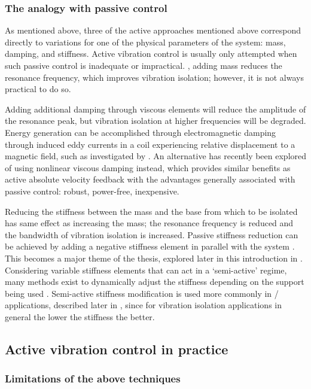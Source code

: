 \subsubsection{The analogy with passive control}

As mentioned above, three of the active approaches mentioned above correspond directly to variations for one of the physical parameters of the system: mass, damping, and stiffness.
Active vibration control is usually only attempted when such passive control is inadequate or impractical.
\Eg, adding mass reduces the resonance frequency, which improves vibration isolation; however, it is not always practical to do so.

Adding additional damping through viscous elements will reduce the amplitude of the resonance peak, but vibration isolation at higher frequencies will be degraded.
Energy generation can be accomplished through electromagnetic damping through induced eddy currents in a coil experiencing relative displacement to a magnetic field, such as investigated by \textcite{graves2000}.
An alternative has recently been explored of using nonlinear viscous damping instead, which provides similar benefits as active absolute velocity feedback  \cite{lang2009} with the advantages generally associated with passive control: robust, power-free, inexpensive.

Reducing the stiffness between the mass and the base from which to be isolated has same effect as increasing the mass; the resonance frequency is reduced and the bandwidth of vibration isolation is increased.
Passive stiffness reduction can be achieved by adding a negative stiffness element in parallel with the system \cite{lee2007-jsv,xing2005}.
This becomes a major theme of the thesis, explored later in this introduction in .
Considering variable stiffness elements that can act in a `semi-active' regime, many methods exist to dynamically adjust the stiffness depending on the support being used \cite[for example]{kidner2002,liu2006a}.
Semi-active stiffness modification is used more commonly in \vibneut/ applications, described later in , since for vibration isolation applications in general the lower the stiffness the better.

\subsection{Active vibration control in practice}

\subsubsection{Limitations of the above techniques}

